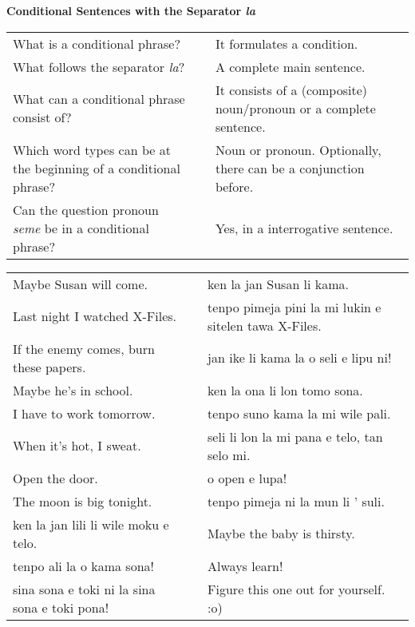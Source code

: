 \textbf{Conditional Sentences with the Separator \textit{la}} 
\label{'la'}

\begin{supertabular}{p{5,5cm}|ll}
What is a conditional phrase? && It formulates a condition. \\  %
What follows the separator \textit{la}? && A complete main sentence.  \\  %
What can a conditional phrase consist of?  && It consists of a (composite) noun/pronoun or a complete sentence. \\  %
Which word types can be at the beginning of a conditional phrase? && Noun or pronoun. Optionally, there can be a conjunction before. \\  %
Can the question pronoun \textit{seme} be in a conditional phrase? && Yes, in a interrogative sentence.  \\  %
\end{supertabular}

\begin{supertabular}{p{5,5cm}|ll}
Maybe Susan will come.  && ken la jan Susan li kama. \\ %
Last night I watched X-Files.  && tenpo pimeja pini la mi lukin e sitelen tawa X-Files. \\ %
If the enemy comes, burn these papers.  && jan ike li kama la o seli e lipu ni! \\ %
Maybe he's in school.  && ken la ona li lon tomo sona. \\ %
I have to work tomorrow.  && tenpo suno kama la mi wile pali. \\ %
When it's hot, I sweat.  && seli li lon la mi pana e telo, tan selo mi. \\ %
Open the door.  && o open e lupa! \\ %
The moon is big tonight.  && tenpo pimeja ni la mun li ' suli. \\ %
ken la jan lili li wile moku e telo.  && Maybe the baby is thirsty. \\
tenpo ali la o kama sona!  && Always learn!  \\
sina sona e toki ni la sina sona e toki pona!  && Figure this one out for yourself. :o) \\
\end{supertabular}  
